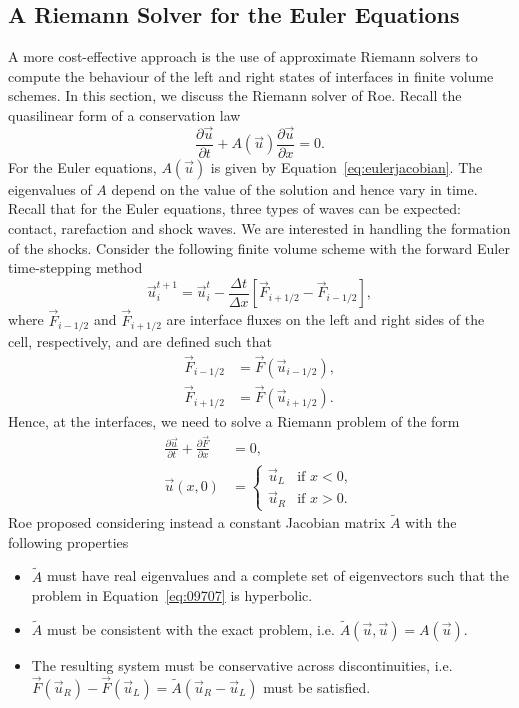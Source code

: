 \subsection{A Riemann Solver for the Euler Equations}
A more cost-effective approach is the use of approximate Riemann solvers to compute the behaviour of the left and right states of interfaces in finite volume schemes. In this section, we discuss the Riemann solver of Roe. Recall the quasilinear form of a conservation law
\begin{equation}
	\frac{\partial \vec u}{\partial t} + A(\vec u) \frac{\partial \vec u}{\partial x} = 0.
	\label{eq:09707}
\end{equation}
For the Euler equations, $A(\vec u)$ is given by Equation~\ref{eq:eulerjacobian}. The eigenvalues of $A$ depend on the value of the solution and hence vary in time. Recall that for the Euler equations, three types of waves can be expected: contact, rarefaction and shock waves. We are interested in handling the formation of the shocks.  Consider the following finite volume scheme with the forward Euler time-stepping method
\begin{equation}
	\vec u^{t+1}_i = \vec u^t_i - \frac{\Delta t}{\Delta x} \left[\vec F_{i+1/2} - \vec F_{i-1/2}\right],
\end{equation}
where $\vec F_{i-1/2}$ and $\vec F_{i+1/2}$ are interface fluxes on the left and right sides of the cell, respectively, and are defined such that
\begin{align}
	\vec F_{i-1/2} &= \vec F (\vec u_{i-1/2}), \\
	\vec F_{i+1/2} &= \vec F (\vec u_{i+1/2}).
\end{align}
Hence, at the interfaces, we need to solve a Riemann problem of the form
\begin{align}
	\frac{\partial \vec u}{\partial t} + \frac{\partial \vec F}{\partial x} &= 0,\\
	\vec u(x, 0) &=
	\begin{cases}
		\vec u_L & \text{if } x<0,\\
		\vec u_R & \text{if } x>0.
	\end{cases}
\end{align}
Roe proposed considering instead a constant Jacobian matrix $\tilde A$ with the following properties~\cite{toroRiemannSolversEvolved2006}
\begin{itemize}
	\item $\tilde A$ must have real eigenvalues and a complete set of eigenvectors such that the problem in Equation~\ref{eq:09707} is hyperbolic.
	\item $\tilde A$ must be consistent with the exact problem, i.e. $\tilde A (\vec u, \vec u) = A(\vec u)$.
	\item The resulting system must be conservative across discontinuities, i.e. $\vec F(\vec u_R) - \vec F (\vec u_L) = \tilde A(\vec u_R - \vec u_L)$ must be satisfied.
\end{itemize}
